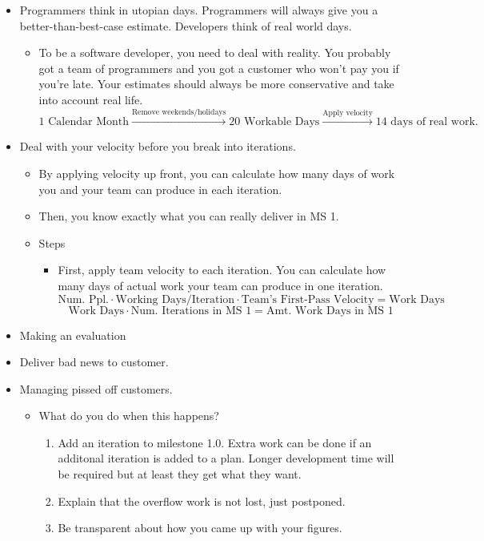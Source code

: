 \documentclass[letterpaper]{article}
\begin{document}
\begin{itemize}
    \item Programmers think in utopian days. Programmers will always give you a better-than-best-case estimate. Developers think of real world days. 
    \begin{itemize}
        \item To be a software developer, you need to deal with reality. You probably got a team of programmers and you got a customer who won't pay you if you're late. Your estimates should always be more conservative and take into account real life. 
        \[\text{1 Calendar Month} \xrightarrow{\text{Remove weekends/holidays}} \text{20 Workable Days} \xrightarrow{\text{Apply velocity}} \text{14 days of real work.}\]
    \end{itemize}

    \item Deal with your velocity before you break into iterations. 
    \begin{itemize}
        \item By applying velocity up front, you can calculate how many days of work you and your team can produce in each iteration. 
        \item Then, you know exactly what you can really deliver in MS 1. 
        \item Steps 
        \begin{itemize}
            \item First, apply team velocity to each iteration. You can calculate how many days of actual work your team can produce in one iteration. 
            \[\text{Num. Ppl.} \cdot \text{Working Days/Iteration} \cdot \text{Team's First-Pass Velocity} = \text{Work Days}\]
            \[\text{Work Days} \cdot \text{Num. Iterations in MS 1} = \text{Amt. Work Days in MS 1}\]
        \end{itemize}
    \end{itemize}

    \item Making an evaluation 
    \item Deliver bad news to customer. 
    \item Managing pissed off customers. 
    \begin{itemize}
        \item What do you do when this happens? 
        \begin{enumerate}
            \item Add an iteration to milestone 1.0. Extra work can be done if an additonal iteration is added to a plan. Longer development time will be required but at least they get what they want. 
            \item Explain that the overflow work is not lost, just postponed. 
            \item Be transparent about how you came up with your figures. 
        \end{enumerate}
    \end{itemize}
\end{itemize}
\end{document}
